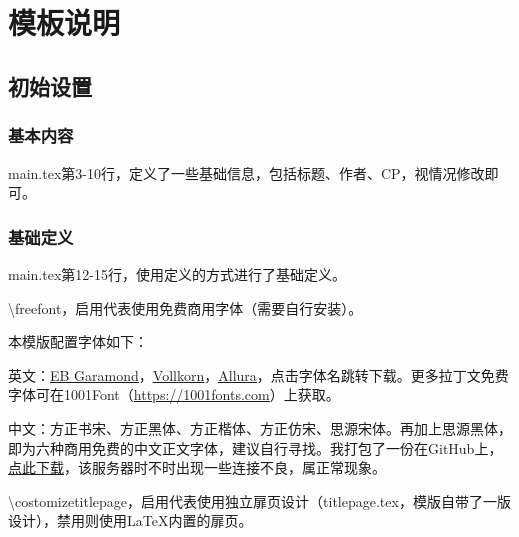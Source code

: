\documentclass[10pt,openany]{book}
\title{\mytitleen\\\mytitle}
\author{\myauthor}
\date{}
\def\costomizetitlepage{} %
\begin{document}
\pagestyle{mystyle}

\ifdefined\costomizetitlepage
    
\else
    \maketitle
\fi

\tocgeo
\tableofcontents
\thispagestyle{empty}

\cleardoublepage
\setcounter{page}{1}
\restoregeometry

\part{模板说明}

\chapter{初始设置}

\section{基本内容}

main.tex第3-10行，定义了一些基础信息，包括标题、作者、CP，视情况修改即可。

\section{基础定义}

main.tex第12-15行，使用定义的方式进行了基础定义。

\textbackslash freefont，启用代表使用免费商用字体（需要自行安装）。

本模版配置字体如下：

英文：\href{https://www.1001fonts.com/eb-garamond-font.html}{\underline{EB Garamond}}，\href{https://www.1001fonts.com/vollkorn-font.html}{\underline{Vollkorn}}，\href{https://www.1001fonts.com/allura-font.html}{\underline{Allura}}，点击字体名跳转下载。更多拉丁文免费字体可在1001Font（\href{https://1001fonts.com}{\underline{https://1001fonts.com}}）上获取。

中文：方正书宋、方正黑体、方正楷体、方正仿宋、思源宋体。再加上思源黑体，即为六种商用免费的中文正文字体，建议自行寻找。我打包了一份在GitHub上，\href{https://github.com/zhuty18/fanfiction-sample/releases/download/v1.0/fonts.zip}{\underline{点此下载}}，该服务器时不时出现一些连接不良，属正常现象。

\textbackslash costomizetitlepage，启用代表使用独立扉页设计（titlepage.tex，模版自带了一版设计），禁用则使用\LaTeX 内置的扉页。
\end{document}
